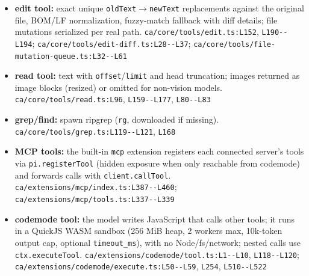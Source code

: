 \begin{itemize}
\item \textbf{edit tool:} exact unique \texttt{oldText}$\rightarrow$\texttt{newText} replacements against the original file, BOM/LF normalization, fuzzy-match fallback with diff details; file mutations serialized per real path. \texttt{ca/\allowbreak{}core/\allowbreak{}tools/\allowbreak{}edit.\allowbreak{}ts:\allowbreak{}L152}, \texttt{L190-\allowbreak{}-\allowbreak{}L194}; \texttt{ca/\allowbreak{}core/\allowbreak{}tools/\allowbreak{}edit-\allowbreak{}diff.\allowbreak{}ts:\allowbreak{}L28-\allowbreak{}-\allowbreak{}L37}; \texttt{ca/\allowbreak{}core/\allowbreak{}tools/\allowbreak{}file-\allowbreak{}mutation-\allowbreak{}queue.\allowbreak{}ts:\allowbreak{}L32-\allowbreak{}-\allowbreak{}L61}
\item \textbf{read tool:} text with \texttt{offset}/\texttt{limit} and head truncation; images returned as image blocks (resized) or omitted for non-vision models. \texttt{ca/\allowbreak{}core/\allowbreak{}tools/\allowbreak{}read.\allowbreak{}ts:\allowbreak{}L96}, \texttt{L159-\allowbreak{}-\allowbreak{}L177}, \texttt{L80-\allowbreak{}-\allowbreak{}L83}
\item \textbf{grep/find:} spawn ripgrep (\texttt{rg}, downloaded if missing). \texttt{ca/\allowbreak{}core/\allowbreak{}tools/\allowbreak{}grep.\allowbreak{}ts:\allowbreak{}L119-\allowbreak{}-\allowbreak{}L121}, \texttt{L168}
\item \textbf{MCP tools:} the built-in \texttt{mcp} extension registers each connected server's tools via \texttt{pi.\allowbreak{}registerTool} (hidden exposure when only reachable from codemode) and forwards calls with \texttt{client.\allowbreak{}callTool}. \texttt{ca/\allowbreak{}extensions/\allowbreak{}mcp/\allowbreak{}index.\allowbreak{}ts:\allowbreak{}L387-\allowbreak{}-\allowbreak{}L460}; \texttt{ca/\allowbreak{}extensions/\allowbreak{}mcp/\allowbreak{}tools.\allowbreak{}ts:\allowbreak{}L337-\allowbreak{}-\allowbreak{}L339}
\item \textbf{codemode tool:} the model writes JavaScript that calls other tools; it runs in a QuickJS WASM sandbox (256 MiB heap, 2 workers max, 10k-token output cap, optional \texttt{timeout\_\allowbreak{}ms}), with no Node/fs/network; nested calls use \texttt{ctx.\allowbreak{}executeTool}. \texttt{ca/\allowbreak{}extensions/\allowbreak{}codemode/\allowbreak{}tool.\allowbreak{}ts:\allowbreak{}L1-\allowbreak{}-\allowbreak{}L10}, \texttt{L118-\allowbreak{}-\allowbreak{}L120}; \texttt{ca/\allowbreak{}extensions/\allowbreak{}codemode/\allowbreak{}execute.\allowbreak{}ts:\allowbreak{}L50-\allowbreak{}-\allowbreak{}L59}, \texttt{L254}, \texttt{L510-\allowbreak{}-\allowbreak{}L522}

\end{itemize}

